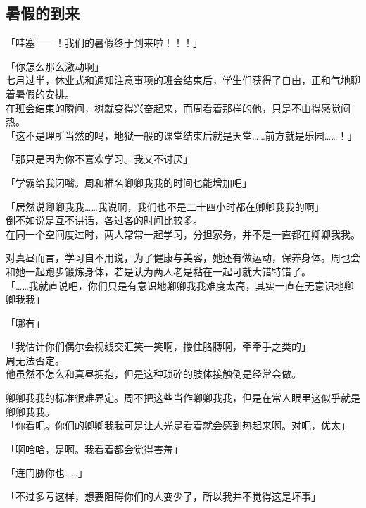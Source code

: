 \subsection{暑假的到来}

「哇塞——！我们的暑假终于到来啦！！！」

「你怎么那么激动啊」\\

七月过半，休业式和通知注意事项的班会结束后，学生们获得了自由，正和气地聊着暑假的安排。\\

在班会结束的瞬间，树就变得兴奋起来，而周看着那样的他，只是不由得感觉闷热。\\

「这不是理所当然的吗，地狱一般的课堂结束后就是天堂……前方就是乐园……！」

「那只是因为你不喜欢学习。我又不讨厌」

「学霸给我闭嘴。周和椎名卿卿我我的时间也能增加吧」

「居然说卿卿我我……我说啊，我们也不是二十四小时都在卿卿我我的啊」\\

倒不如说是互不讲话，各过各的时间比较多。\\

在同一个空间度过时，两人常常一起学习，分担家务，并不是一直都在卿卿我我。

对真昼而言，学习自不用说，为了健康与美容，她还有做运动，保养身体。周也会和她一起跑步锻炼身体，若是认为两人老是黏在一起可就大错特错了。\\

「……我就直说吧，你们只是有意识地卿卿我我难度太高，其实一直在无意识地卿卿我我」

「哪有」

「我估计你们偶尔会视线交汇笑一笑啊，搂住胳膊啊，牵牵手之类的」\\

周无法否定。\\

他虽然不怎么和真昼拥抱，但是这种琐碎的肢体接触倒是经常会做。

卿卿我我的标准很难界定。周不把这些当作卿卿我我，但是在常人眼里这似乎就是卿卿我我。\\

「你看吧。你们的卿卿我我可是让人光是看着就会感到热起来啊。对吧，优太」

「啊哈哈，是啊。我看着都会觉得害羞」

「连门胁你也……」

「不过多亏这样，想要阻碍你们的人变少了，所以我并不觉得这是坏事」\\

